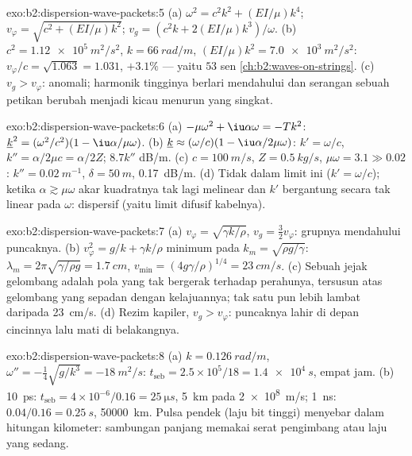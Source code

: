 \begin{solution}{exo:b2:dispersion-wave-packets:5}
(a) $\omega^2 = c^2k^2 + (EI/\mu)k^4$; $v_\varphi = \sqrt{c^2 + (EI/\mu)k^2}$; $v_g = (c^2k +
2(EI/\mu)k^3)/\omega$. (b) $c^2 = \qty{1.12e5}{m^2/s^2}$, $k = \qty{66}{rad/m}$, $(EI/\mu)k^2
= \qty{7.0e3}{m^2/s^2}$: $v_\varphi/c = \sqrt{1.063} = 1.031$, $+3.1\%$ --- yaitu $53$ sen
\cref{ch:b2:waves-on-strings}. (c) $v_g > v_\varphi$: anomali; harmonik
tingginya berlari mendahului dan serangan sebuah petikan berubah menjadi kicau
menurun yang singkat.
\end{solution}

\begin{solution}{exo:b2:dispersion-wave-packets:6}
(a) $-\mu\omega^2 + \iu\alpha\omega = -Tk^2$: $\underline k^2 = (\omega^2/c^2)(1 - \iu\alpha/\mu\omega)$.
(b) $\underline k \approx (\omega/c)(1 - \iu\alpha/2\mu\omega)$: $k' = \omega/c$, $k'' = \alpha/2\mu c =
\alpha/2Z$; $8.7k''$ dB/m. (c) $c = \qty{100}{m/s}$, $Z = \qty{0.5}{kg/s}$, $\mu\omega = 3.1 \gg
0.02$: $k'' = \qty{0.02}{m^{-1}}$, $\delta = \qty{50}{m}$, \qty{0.17}{dB/m}. (d) Tidak dalam limit
ini ($k' = \omega/c$); ketika $\alpha \gtrsim \mu\omega$ akar kuadratnya tak lagi
melinear dan $k'$ bergantung secara tak linear pada $\omega$: dispersif (yaitu
limit difusif kabelnya).
\end{solution}

\begin{solution}{exo:b2:dispersion-wave-packets:7}
(a) $v_\varphi = \sqrt{\gamma k/\rho}$, $v_g = \tfrac32v_\varphi$: grupnya mendahului
puncaknya. (b) $v_\varphi^2 = g/k + \gamma k/\rho$ minimum pada $k_m = \sqrt{\rho g/\gamma}$:
$\lambda_m = 2\pi\sqrt{\gamma/\rho g} = \qty{1.7}{cm}$, $v_{\min} = (4g\gamma/\rho)^{1/4} =
\qty{23}{cm/s}$. (c) Sebuah jejak gelombang adalah pola yang tak bergerak terhadap
perahunya, tersusun atas gelombang yang  sepadan dengan kelajuannya; tak satu pun
lebih lambat daripada \qty{23}{cm/s}. (d) Rezim kapiler, $v_g > v_\varphi$: puncaknya
lahir di depan cincinnya lalu mati di belakangnya.
\end{solution}

\begin{solution}{exo:b2:dispersion-wave-packets:8}
(a) $k = \qty{0.126}{rad/m}$, $\omega'' = -\tfrac14\sqrt{g/k^3} = \qty{-18}{m^2/s}$: $t_{\text{seb}}
= 2.5 \times 10^5/18 = \qty{1.4e4}{s}$, empat jam. (b) \qty{10}{ps}: $t_{\text{seb}} =
4 \times 10^{-6}/0.16 = \qty{25}{\micro s}$, \qty{5}{km} pada \qty{2e8}{m/s}; \qty{1}{ns}: $0.04/0.16 =
\qty{0.25}{s}$, \qty{50000}{km}. Pulsa pendek (laju bit tinggi) menyebar dalam
hitungan kilometer: sambungan panjang memakai serat pengimbang atau laju yang sedang.
\end{solution}


